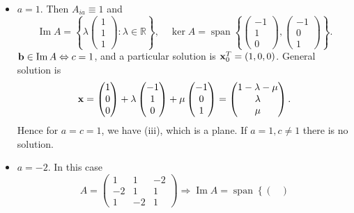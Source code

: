 \documentclass[10pt]{article}
\DeclareMathOperator{\spn}{span}
\DeclareMathOperator{\im}{Im}
\begin{document}
\begin{example}
\begin{itemize}
            \item \underline{$a=1$}. Then $A_{ia}\equiv 1$ and 
            \[
                \im A=\left\{ \lambda\begin{pmatrix}
                    1\\1\\1
                \end{pmatrix} : \lambda\in \mathbb{R} \right\},\quad \ker A = \spn\left\{ \begin{pmatrix}
                    -1\\1\\0
                \end{pmatrix},\begin{pmatrix}
                    -1\\0\\1
                \end{pmatrix} \right\}
            .\]
            $ \bfb\in \im A \Leftrightarrow c=1 $, and a particular solution is $ {\bf x}_0^T=(1,0,0) $. General solution is 
            \[
                {\bf x}=\begin{pmatrix}
                    1\\0\\0
                \end{pmatrix}+\lambda\begin{pmatrix}
                    -1\\1\\0
                \end{pmatrix}+\mu\begin{pmatrix}
                    -1\\0\\1
                \end{pmatrix}=\begin{pmatrix}
                    1-\lambda-\mu\\
                    \lambda\\
                    \mu
                \end{pmatrix}
            .\]
            Hence for $a=c=1$, we have (iii), which is a plane. If $a=1,c\neq 1$ there is no solution.
            \item \underline{$a=-2$}. In this case 
            \[
                A=\begin{pmatrix}
                    1&1&-2\\
                    -2&1&1\\
                    1&-2&1
                \end{pmatrix} \Rightarrow \im A=\spn\left\{ \begin{pmatrix}

\end{pmatrix}\]
\end{itemize}
\end{example}
\end{document}
